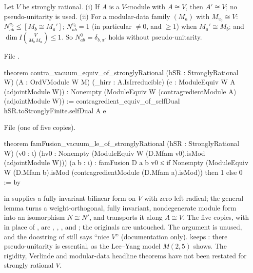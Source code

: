 \begin{theorem}\label{l21:thm:vacSR}
Let $V$ be strongly rational. (i) If $A$ is a $V$-module with $A\cong V$, then $A'\cong V$; no pseudo-unitarity is used.
(ii) For a modular-data family $(M_a)$ with $M_{v_0}\cong V$: $N_{ab}^{v_0}\le[M_b\cong M_a']$; $N_{ab}^{v_0}=1$ (in
particular $\neq0$, and $\ge1$) when $M_a'\cong M_b$; and $\dim I\binom{V}{M_b\,M_a}\le1$. So $N_{ab}^{0}=\delta_{b,a'}$
holds without pseudo-unitarity.
\end{theorem}
\noindent File .
\begin{leancode}
theorem contra_vacuum_equiv_of_stronglyRational (hSR : StronglyRational W) (A : OrdVModule W M)
    (_hirr : A.IsIrreducible) (e : ModuleEquiv W A (adjointModule W)) :
    Nonempty (ModuleEquiv W (contragredientModule A) (adjointModule W)) :=
  contragredient_equiv_of_selfDual hSR.toStronglyFinite.selfDual A e
\end{leancode}
\noindent File  (one of five copies).
\begin{leancode}
theorem famFusion_vacuum_le_of_stronglyRational (hSR : StronglyRational W) (v0 : ι)
    (hv0 : Nonempty (ModuleEquiv W (D.Mfam v0).isMod (adjointModule W))) (a b : ι) :
    famFusion D a b v0
      ≤ if Nonempty (ModuleEquiv W (D.Mfam b).isMod (contragredientModule (D.Mfam a).isMod))
        then 1 else 0 := by
\end{leancode}

\begin{dictionary}
 in  supplies a fully invariant bilinear form on $V$ with zero left radical; the
general lemma  turns a weight-orthogonal, fully invariant, nondegenerate module form
into an isomorphism $N\cong N'$, and transports it along $A\cong V$. The five copies, with  in place
of , are ,
, ,
 and
; the  originals are untouched. The
argument  is unused, and the docstring of  still says ``nice
$V$'' (documentation only).  keeps : there pseudo-unitarity is essential,
as the Lee--Yang model $M(2,5)$ shows. The rigidity, Verlinde and modular-data headline theorems have not been restated
for strongly rational $V$.
\end{dictionary}

